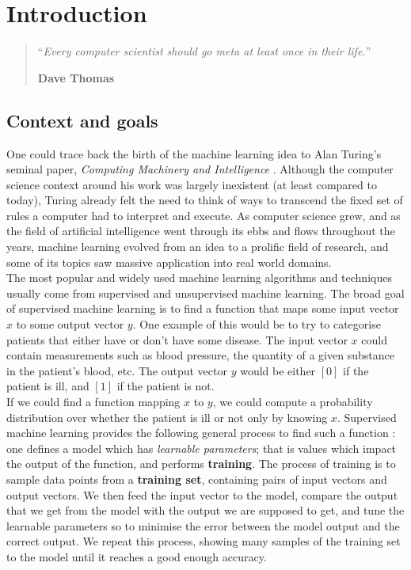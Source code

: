 \chapter{Introduction}
\setcounter{page}{1}
\begin{quotation}
\noindent ``\emph{Every computer scientist should go meta at least once in
	their life.}''
\begin{flushright}\textbf{Dave Thomas}\end{flushright}
\end{quotation}

\vspace*{0.5cm}

\section{Context and goals}
One could trace back the birth of the machine learning idea to Alan Turing's 
seminal paper, \textit{Computing Machinery and Intelligence} 
\cite{turing1950computing}. Although the computer science context around his
work was largely inexistent (at least compared to today), Turing already felt
the need to think of ways to transcend the fixed set of rules a computer had
to interpret and execute. As computer science grew, and as the field of
artificial intelligence went through its ebbs and flows throughout the years,
machine learning evolved from an idea to a prolific field of research, and
some of its topics saw massive application into real world domains.\\

The most popular and widely used machine learning algorithms and techniques
usually come from supervised and unsupervised machine learning.
The broad goal of supervised machine learning is to find a function that maps
some input vector $x$ to some output vector $y$. One example of this would be
to try to categorise patients that either have or don't have some disease. 
The input vector $x$ could contain measurements such as blood pressure, the 
quantity of a given substance in the patient's blood, etc. The output vector
$y$ would be either $[0]$ if the patient is ill, and $[1]$ if the patient is
not.\\

If we could find a function mapping $x$ to $y$, we could compute a probability
distribution over whether the patient is ill or not only by knowing $x$. 
Supervised machine learning provides the following general process to find
such a function : one defines a model which has
\textit{learnable parameters}; that is values which impact the output of the
function, and performs \textbf{training}. The process of training is to
sample data points from a \textbf{training set}, containing pairs of input
vectors and output vectors. We then feed the input vector to the model, compare
the output that we get from the model with the output we are supposed to get,
and tune the learnable parameters so to minimise the error between the model
output and the correct output. We repeat this process, showing many samples
of the training set to the model until it reaches a good enough accuracy.

